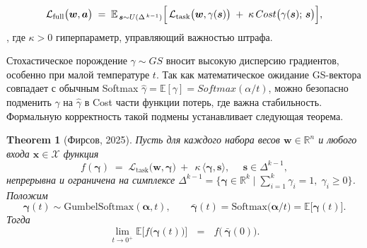 \documentclass{article}
\newtheorem{theorem}{Theorem}
\begin{document}
$$
    \mathcal L_{\mathrm{full}}\bigl(\boldsymbol w,\boldsymbol a\bigr)
    \;=\; 
    \mathbb E_{\,\boldsymbol{s} \sim U(\Delta^{\,k-1})}
    \Bigl[\,
      \mathcal L_{\mathrm{task}}\bigl(\boldsymbol w,\gamma(\boldsymbol{s})\bigr)
      \;+\;\kappa\,Cost\bigl(\gamma(\boldsymbol{s});\,\boldsymbol{s}\bigr)
    \Bigr],
$$
, где $\kappa > 0$ гиперпараметр, управляющий важностью штрафа.

Стохастическое порождение $\gamma\sim GS$ вносит высокую дисперсию градиентов, особенно при малой температуре $t$. Так как математическое ожидание GS-вектора совпадает с обычным Softmax $\hat\gamma = \mathbb E[\gamma] = Softmax(\alpha/t)$, можно безопасно подменить $\gamma$ на $\hat\gamma$ в Cost части функции потерь, где важна стабильность. Формальную корректность такой подмены устанавливает следующая теорема.



\begin{theorem} [Фирсов, 2025]
\label{th:gs_softmax}
Пусть для каждого набора весов $\boldsymbol w\in\mathbb R^n$
и любого входа $\boldsymbol x\in\mathcal X$ функция
$$
   f(\boldsymbol\gamma)
   \;=\;
   \mathcal L_{\mathrm{task}}\!\bigl(\boldsymbol w,\boldsymbol\gamma\bigr)
    \ + \ \  \kappa\,\langle\boldsymbol\gamma,\boldsymbol s\rangle,
    \ \ \ \ \ \ \boldsymbol s\in\Delta^{k-1},
$$
непрерывна и ограничена на симплексе
$\Delta^{k-1}
  =\bigl\{\boldsymbol\gamma\in\mathbb R^{k}\mid\sum_{i=1}^{k}\gamma_i=1,\;
          \gamma_i\ge 0\bigr\}$.
Положим
$$
   \boldsymbol\gamma(t)\sim\mathrm{GumbelSoftmax}(\boldsymbol\alpha,t),
   \qquad
   \boldsymbol{\bar\gamma}(t)=\mathrm{Softmax}\!\bigl(\boldsymbol\alpha/t\bigr)
               =\mathbb E\bigl[\boldsymbol\gamma(t)\bigr].
$$
Тогда
$$
   \lim_{t\to 0^{+}}
       \mathbb E\bigl[f\bigl(\boldsymbol\gamma(t)\bigr)\bigr]
   \ \ \ = \ \ \ 
   f\!\bigl(\,\boldsymbol{\bar\gamma}(0)\bigr).
$$
\end{theorem}
\end{document}
